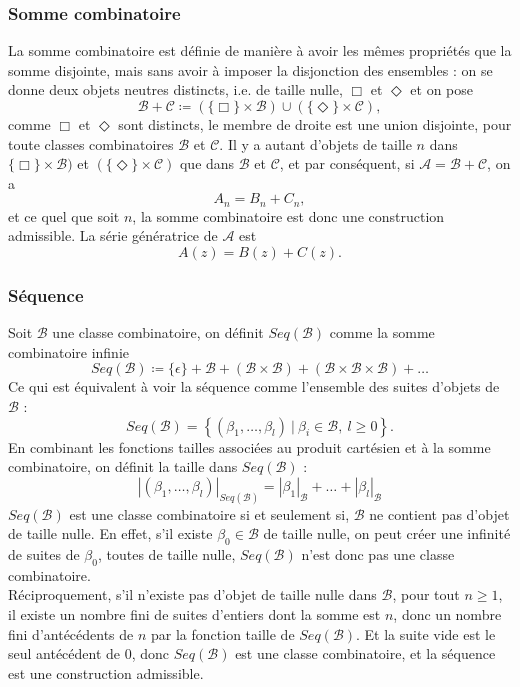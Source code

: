 \documentclass[12pt]{article}
\begin{document}
\subsubsection*{Somme combinatoire}
La somme combinatoire est définie de manière à avoir les mêmes propriétés que la somme disjointe, mais sans avoir à imposer la disjonction des ensembles : on se donne deux objets neutres distincts, i.e. de taille nulle, $\Box$ et $\Diamond$ et on pose
$$\mathcal B + \mathcal C \coloneqq (\{\Box\} \times\mathcal B) \cup (\{\Diamond\} \times\mathcal C),$$
comme $\Box$ et $\Diamond$ sont distincts, le membre de droite est une union disjointe, pour toute classes combinatoires $\mathcal B$ et $\mathcal C$.
Il y a autant d'objets de taille $n$ dans $\{\Box\} \times\mathcal B)$ et $(\{\Diamond\} \times\mathcal C)$ que dans $\mathcal B$ et $\mathcal C$, et par conséquent, si $\mathcal A = \mathcal B + \mathcal C $, on a 
$$A_n = B_n + C_n,$$ et ce quel que soit $n$, la somme combinatoire est donc une construction admissible.
La série génératrice de $\mathcal A$ est 
$$A(z)=B(z)+C(z).$$

\subsubsection*{Séquence}
Soit $\mathcal B$ une classe combinatoire, on définit $Seq (\mathcal B)$ comme la somme combinatoire infinie 
$$Seq (\mathcal B) \coloneqq\{\epsilon\} + \mathcal B + (\mathcal B \times \mathcal B) +(\mathcal B \times \mathcal B \times \mathcal B) + \dots$$
Ce qui est équivalent à voir la séquence comme l'ensemble des suites d'objets de $\mathcal B$ : 
$$Seq(\mathcal B) = \left\{ (\beta_1,\dots,\beta_l)\ |\ \beta_i \in \mathcal B,\ l\geqslant 0\right\}.$$
En combinant les fonctions tailles associées au produit cartésien et à la somme combinatoire, on définit la taille dans $Seq(\mathcal B)$ : 
$$|(\beta_1,\dots,\beta_l)|_{Seq(\mathcal B)} = |\beta_1|_{\mathcal B}+\dots+|\beta_l|_{\mathcal B}$$
$Seq(\mathcal B)$ est une classe combinatoire si et seulement si, $\mathcal B$ ne contient pas d'objet de taille nulle. 
En effet, s'il existe $\beta_0 \in \mathcal B$ de taille nulle, on peut créer une infinité de suites de $\beta_0$, toutes de taille nulle, $Seq(\mathcal B)$ n'est donc pas une classe combinatoire. \\
Réciproquement, s'il n'existe pas d'objet de taille nulle dans $\mathcal B$, pour tout $n\geqslant 1$, il existe un nombre fini de suites d'entiers dont la somme est $n$, donc un nombre fini d'antécédents de $n$ par la fonction taille de $Seq(\mathcal B)$. Et la suite vide est le seul antécédent de $0$, donc $Seq(\mathcal B)$ est une classe combinatoire, et la séquence est une construction admissible.
\end{document}

